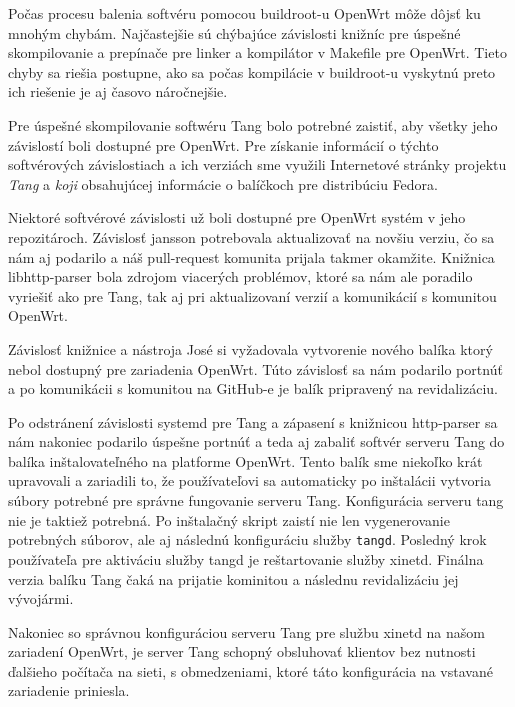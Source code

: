 Počas procesu balenia softvéru pomocou buildroot-u OpenWrt môže dôjsť ku mnohým chybám.
Najčastejšie sú chýbajúce závislosti knižníc pre úspešné skompilovanie a prepínače pre linker a kompilátor v Makefile pre OpenWrt.
Tieto chyby sa riešia postupne, ako sa počas kompilácie v buildroot-u vyskytnú preto ich riešenie je aj časovo náročnejšie.

Pre úspešné skompilovanie softwéru Tang bolo potrebné zaistiť, aby všetky jeho závislostí boli dostupné pre OpenWrt.
Pre získanie informácií o týchto softvérových závislostiach a ich verziách sme využili Internetové stránky projektu {\it Tang} a {\it koji} obsahujúcej informácie o balíčkoch pre distribúciu Fedora.

Niektoré softvérové závislosti už boli dostupné pre OpenWrt systém v jeho repozitároch.
Závislosť jansson potrebovala aktualizovať na novšiu verziu, čo sa nám aj podarilo a náš pull-request komunita prijala takmer okamžite.
Knižnica libhttp-parser bola zdrojom viacerých problémov, ktoré sa nám ale poradilo vyriešiť ako pre Tang, tak aj pri aktualizovaní verzií a komunikácií s komunitou OpenWrt.

Závislosť knižnice a nástroja José si vyžadovala vytvorenie nového balíka ktorý nebol dostupný pre zariadenia OpenWrt.
Túto závislosť sa nám podarilo portnúť a po komunikácii s komunitou na GitHub-e je balík pripravený na revidalizáciu.

Po odstránení závislosti systemd pre Tang a zápasení s knižnicou http-parser sa nám nakoniec podarilo úspešne portnúť a teda aj zabaliť softvér serveru Tang do balíka inštalovateľného na platforme OpenWrt.
Tento balík sme niekoľko krát upravovali a zariadili to, že používateľovi sa automaticky po inštalácii vytvoria súbory potrebné pre správne fungovanie serveru Tang.
Konfigurácia serveru tang nie je taktiež potrebná.
Po inštalačný skript zaistí nie len vygenerovanie potrebných súborov, ale aj následnú konfiguráciu služby {\tt tangd}.
Posledný krok používateľa pre aktiváciu služby tangd je reštartovanie služby xinetd.
Finálna verzia balíku Tang čaká na prijatie kominitou a následnu revidalizáciu jej vývojármi.

Nakoniec so správnou konfiguráciou serveru Tang pre službu xinetd na našom zariadení OpenWrt, je server Tang schopný obsluhovať klientov bez nutnosti ďalšieho počítača na sieti, s obmedzeniami, ktoré táto konfigurácia na vstavané zariadenie priniesla.
